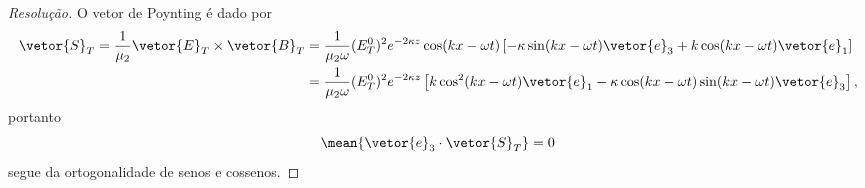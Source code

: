 \begin{proof}[Resolução]
    O vetor de Poynting é dado por
    \begin{align*}
        \vetor{S}_T = \frac1{\mu_2}\vetor{E}_T\times \vetor{B}_T
        &= \frac{1}{\mu_2 \omega} (E_T^0)^2 e^{- 2 \kappa z} \cos(kx - \omega t) \left[- \kappa \sin(kx - \omega t) \vetor{e}_3 + k \cos(kx - \omega t)\vetor{e}_1\right]\\
        &= \frac{1}{\mu_2 \omega} (E_T^0)^2 e^{-2 \kappa z} \left[k \cos^2(kx - \omega t) \vetor{e}_1 - \kappa \cos(kx - \omega t)\sin(kx - \omega t)\vetor{e}_3\right],
    \end{align*}
    portanto
    \begin{equation*}
        \mean{\vetor{e}_3\cdot\vetor{S}_T} = 0
    \end{equation*}
    segue da ortogonalidade de senos e cossenos.
\end{proof}
